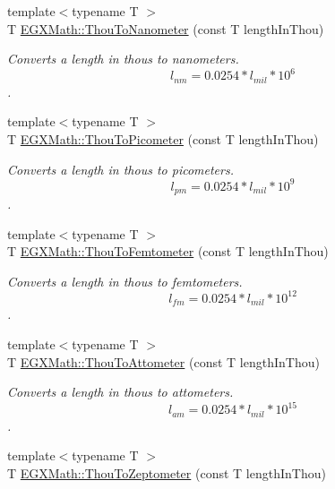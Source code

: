 \begin{DoxyCompactItemize}
{\footnotesize template$<$typename T $>$ }\\T \mbox{\hyperlink{group___e_g_x_math-_conversions-_length_conversions-_imperial-_thou-_s_i_gadc6f45eeae7d4fe8bb993419c96e1860}{E\+G\+X\+Math\+::\+Thou\+To\+Nanometer}} (const T length\+In\+Thou)
\begin{DoxyCompactList}\small\item\em Converts a length in thous to nanometers. \[ l_{nm}=0.0254 * l_{mil} * 10^{6} \]. \end{DoxyCompactList}\item 
{\footnotesize template$<$typename T $>$ }\\T \mbox{\hyperlink{group___e_g_x_math-_conversions-_length_conversions-_imperial-_thou-_s_i_gabc7a92b07f617bdf0ac0249d34c4aa4c}{E\+G\+X\+Math\+::\+Thou\+To\+Picometer}} (const T length\+In\+Thou)
\begin{DoxyCompactList}\small\item\em Converts a length in thous to picometers. \[ l_{pm}=0.0254 * l_{mil} * 10^{9} \]. \end{DoxyCompactList}\item 
{\footnotesize template$<$typename T $>$ }\\T \mbox{\hyperlink{group___e_g_x_math-_conversions-_length_conversions-_imperial-_thou-_s_i_gaecb2f2011c7b1c81a6b94cf3111cc107}{E\+G\+X\+Math\+::\+Thou\+To\+Femtometer}} (const T length\+In\+Thou)
\begin{DoxyCompactList}\small\item\em Converts a length in thous to femtometers. \[ l_{fm}=0.0254 * l_{mil} * 10^{12} \]. \end{DoxyCompactList}\item 
{\footnotesize template$<$typename T $>$ }\\T \mbox{\hyperlink{group___e_g_x_math-_conversions-_length_conversions-_imperial-_thou-_s_i_ga6e15cb5df637254290eebc91c3e2867d}{E\+G\+X\+Math\+::\+Thou\+To\+Attometer}} (const T length\+In\+Thou)
\begin{DoxyCompactList}\small\item\em Converts a length in thous to attometers. \[ l_{am}=0.0254 * l_{mil} * 10^{15} \]. \end{DoxyCompactList}\item 
{\footnotesize template$<$typename T $>$ }\\T \mbox{\hyperlink{group___e_g_x_math-_conversions-_length_conversions-_imperial-_thou-_s_i_ga496bafe1152fe3ede3021fd49289b6e5}{E\+G\+X\+Math\+::\+Thou\+To\+Zeptometer}} (const T length\+In\+Thou)

\end{DoxyCompactItemize}
